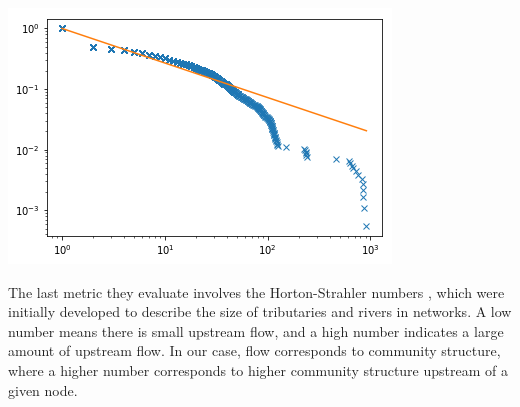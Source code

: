 \documentclass[12pt,twoside]{report}
\begin{document}
\begin{center}
\begin{minipage}{0.45\linewidth}
\end{minipage}%
\hfill
\begin{minipage}{0.45\linewidth}
\includegraphics[width=\linewidth]{figures/1750_curve.png}
\end{minipage}
\end{center}


The last metric they evaluate involves the Horton-Strahler numbers \cite{horton1945erosional, strahler1952dynamic}, which were initially developed to describe the size of tributaries and rivers in networks. A low number means there is small upstream flow, and a high number indicates a large amount of upstream flow. In our case, flow corresponds to community structure, where a higher number corresponds to higher community structure upstream of a given node. \\
\end{document}
